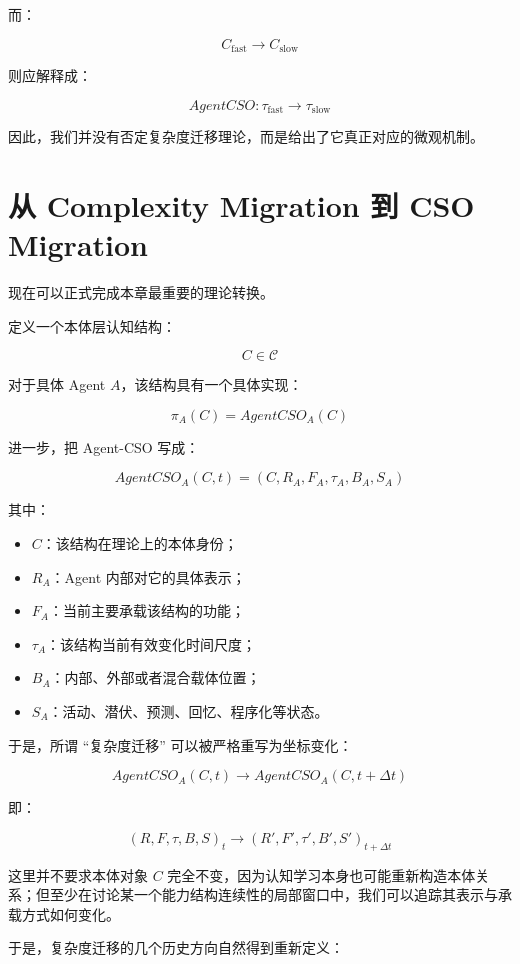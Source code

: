 而：

\[
C_{\mathrm{fast}}
\rightarrow
C_{\mathrm{slow}}
\]

则应解释成：

\[
AgentCSO:
\tau_{\mathrm{fast}}
\rightarrow
\tau_{\mathrm{slow}}
\]

因此，我们并没有否定复杂度迁移理论，而是给出了它真正对应的微观机制。

\section{从 Complexity Migration 到 CSO Migration}
\label{sec:complexity-to-cso}

现在可以正式完成本章最重要的理论转换。

定义一个本体层认知结构：

\[
C\in\mathcal C
\]

对于具体 Agent $A$，该结构具有一个具体实现：

\[
\pi_A(C)
=
AgentCSO_A(C)
\]

进一步，把 Agent-CSO 写成：

\[
\boxed{
AgentCSO_A(C,t)
=
\left(
C,
R_A,
F_A,
\tau_A,
B_A,
S_A
\right)
}
\]

其中：

\begin{itemize}
    \item $C$：该结构在理论上的本体身份；
    \item $R_A$：Agent 内部对它的具体表示；
    \item $F_A$：当前主要承载该结构的功能；
    \item $\tau_A$：该结构当前有效变化时间尺度；
    \item $B_A$：内部、外部或者混合载体位置；
    \item $S_A$：活动、潜伏、预测、回忆、程序化等状态。
\end{itemize}

于是，所谓 ``复杂度迁移'' 可以被严格重写为坐标变化：

\[
AgentCSO_A(C,t)
\rightarrow
AgentCSO_A(C,t+\Delta t)
\]

即：

\[
(R,F,\tau,B,S)_t
\rightarrow
(R',F',\tau',B',S')_{t+\Delta t}
\]

这里并不要求本体对象 $C$ 完全不变，因为认知学习本身也可能重新构造本体关系；但至少在讨论某一个能力结构连续性的局部窗口中，我们可以追踪其表示与承载方式如何变化。

于是，复杂度迁移的几个历史方向自然得到重新定义：

